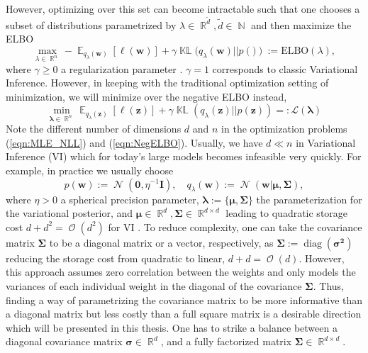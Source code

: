 \documentclass[a4paper, 11pt, oneside]{scrartcl}
\theoremstyle{break}
\DeclareMathOperator{\Normal}{\mathcal{N}}
\DeclareMathOperator{\Natural}{\mathbb{N}}
\DeclareMathOperator{\Real}{\mathbb{R}}
\DeclareMathOperator{\diag}{diag}
\DeclareMathOperator{\Expect}{\mathbb{E}}
\DeclareMathOperator{\BigO}{\mathcal{O}}
\DeclareMathOperator{\KL}{\mathbb{KL}}
\newcommand{\matr}[1]{\boldsymbol{#1}}
\newcommand{\set}[1]{\mathcal{#1}}
\numberwithin{equation}{section}
\begin{document}
			However, optimizing over this set can become intractable such that one chooses a subset of distributions parametrized by $\lambda \in \Real^{\tilde{d}}, \tilde{d} \in \Natural$ and then maximize the ELBO 
			\begin{equation}
				\max_{\lambda \in \Real^n} -\Expect_{q_{\lambda}(\matr{w})}[\ell(\matr{w})] + \gamma \KL(q_{\lambda}(\matr{w}) || p(\matr)) := \text{ELBO}(\lambda),
				\label{eqn:ELBO}
			\end{equation}
			where $\gamma \ge 0$ a regularization parameter \parencite{ZSD+17, LSK20, LNK+21}.
			$\gamma = 1$ corresponds to classic Variational Inference. 
			However, in keeping with the traditional optimization setting of minimization, we will minimize over the negative ELBO instead,
			\begin{equation*}
				\min_{\matr{\lambda} \in \Real^n} \Expect_{q_{\lambda}(\matr{z})}[\ell(\matr{z})] + \gamma \KL(q_{\lambda}(\matr{z}) || p(\matr{z})) =: \set{L}(\matr{\lambda})
				\label{eqn:NegELBO}
			\end{equation*}
			Note the different number of dimensions $d$ and $n$ in the optimization problems (\ref{eqn:MLE_NLL}) and (\ref{eqn:NegELBO}).
			Usually, we have $d \ll n$ in Variational Inference (VI) which for today's large models becomes infeasible very quickly. 
			For example, in practice we usually choose 
			\begin{equation}
				p(\matr{w}) := \Normal(\matr{0}, \eta^{-1} \matr{I}), \quad q_{\lambda}(\matr{w}) := \Normal(\matr{w} | \matr{\mu}, \matr{\Sigma}),
				\label{eqn:VI_Normal}
			\end{equation}
			where $\eta > 0$ a spherical precision parameter, $\matr{\lambda} := \{\matr{\mu}, \matr{\Sigma}\}$ the parameterization for the variational posterior, and $\matr{\mu} \in \Real^d, \matr{\Sigma} \in \Real^{d \times d}$ leading to quadratic storage cost $d + d^2 = \BigO(d^2)$ for VI \parencite{ZSD+17, KNT+18, LSK20}.
			To reduce complexity, one can take the covariance matrix $\matr{\Sigma}$ to be a diagonal matrix or a vector, respectively, as $\matr{\Sigma} := \diag(\matr{\sigma^2})$ reducing the storage cost from quadratic to linear, $d + d = \BigO(d)$. 
			However, this approach assumes zero correlation between the weights and only models the variances of each individual weight in the diagonal of the covariance $\matr{\Sigma}$. 
			Thus, finding a way of parametrizing the covariance matrix to be more informative than a diagonal matrix but less costly than a full square matrix is a desirable direction which will be presented in this thesis.
			One has to strike a balance between a diagonal covariance matrix $\matr{\sigma} \in \Real^d$, and a fully factorized matrix $\matr{\Sigma} \in \Real^{d \times d}$.
\end{document}
